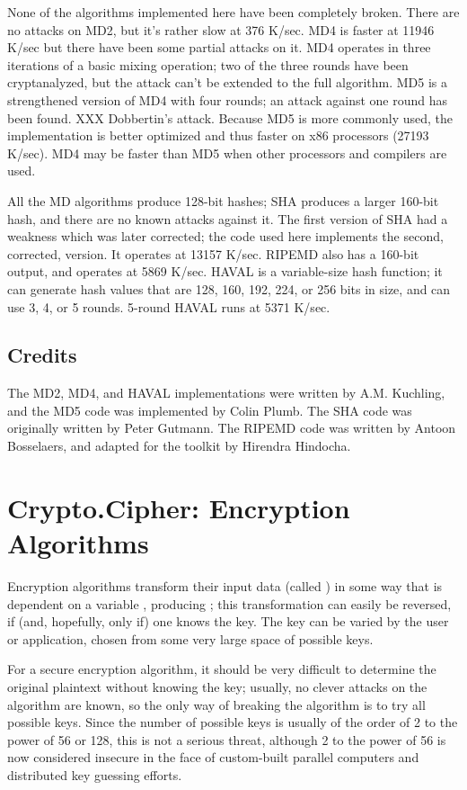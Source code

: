 \documentclass{howto}
\begin{document}
None of the algorithms implemented here have been completely broken.
There are no attacks on MD2, but it's rather slow at 376 K/sec.  MD4 is
faster at 11946 K/sec but there have been some partial attacks on it.  MD4
operates in three iterations of a basic mixing operation; two of the
three rounds have been cryptanalyzed, but the attack can't be extended
to the full algorithm.  MD5 is a strengthened version of MD4 with four
rounds; an attack against one round has been found.  XXX Dobbertin's
attack.  Because MD5 is more
commonly used, the implementation is better optimized and thus faster on
x86 processors (27193 K/sec).  MD4 may be faster than MD5 when other
processors and compilers are used.

All the MD algorithms produce 128-bit hashes; SHA produces a larger 160-bit
hash, and there are no known attacks against it.  The first version of
SHA had a weakness which was later corrected; the code used here
implements the second, corrected, version.  It operates at 13157 K/sec.
RIPEMD also has a 160-bit output, and operates at 5869 K/sec.
HAVAL is a variable-size hash function; it can generate hash values that
are 128, 160, 192, 224, or 256 bits in size, and can use 3, 4, or 5
rounds.  5-round HAVAL runs at 5371 K/sec.

\subsection{Credits}
The MD2, MD4, and HAVAL implementations were written by A.M. Kuchling,
and the MD5 code was implemented by Colin Plumb.  The SHA code was
originally written by Peter Gutmann.  The RIPEMD code was written by
Antoon Bosselaers, and adapted for the toolkit by Hirendra Hindocha.

\section{Crypto.Cipher: Encryption Algorithms}
Encryption algorithms transform their input data (called
) in some way that is
dependent on a variable , producing ;
this transformation can easily be reversed, if (and, hopefully, only
if) one knows the key.  The key can be varied by the user or
application, chosen from some very large space of possible keys. 

For a secure encryption algorithm, it should be very difficult to
determine the original plaintext without knowing the key; usually, no
clever attacks on the algorithm are known, so the only way of breaking
the algorithm is to try all possible keys. Since the number of possible
keys is usually of the order of 2 to the power of 56 or 128, this is not
a serious threat, although 2 to the power of 56 is now considered
insecure in the face of custom-built parallel computers and distributed
key guessing efforts.
\end{document}
